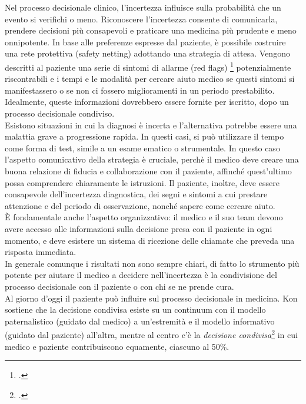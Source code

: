 Nel processo decisionale clinico, l'incertezza influisce sulla probabilità che un evento si verifichi o meno. Riconoscere l'incertezza consente di comunicarla, prendere decisioni più consapevoli e praticare una medicina più prudente e meno onnipotente.
In base alle preferenze espresse dal paziente, è possibile costruire una rete protettiva (safety netting) adottando una strategia di attesa. Vengono descritti al paziente una serie di sintomi di allarme (red flags) \footcite{womak:recenti-progressi-medicina} potenzialmente riscontrabili e i tempi e le modalità per cercare aiuto medico se questi sintomi si manifestassero o se non ci fossero miglioramenti in un periodo prestabilito. Idealmente, queste informazioni dovrebbero essere fornite per iscritto, dopo un processo decisionale condiviso.\\

Esistono situazioni in cui la diagnosi è incerta e l'alternativa potrebbe essere una malattia grave a progressione rapida. In questi casi, si può utilizzare il tempo come forma di test, simile a un esame ematico o strumentale. In questo caso l'aspetto comunicativo della strategia è cruciale, perchè il medico deve creare una buona relazione di fiducia e collaborazione con il paziente, affinché quest'ultimo possa comprendere chiaramente le istruzioni. Il paziente, inoltre, deve essere consapevole dell'incertezza diagnostica, dei segni e sintomi a cui prestare attenzione e del periodo di osservazione, nonché sapere come cercare aiuto.\\
È fondamentale anche l'aspetto organizzativo: il medico e il suo team devono avere accesso alle informazioni sulla decisione presa con il paziente in ogni momento, e deve esistere un sistema di ricezione delle chiamate che preveda una risposta immediata.\\
In generale comunque i risultati non sono sempre chiari, di fatto lo strumento più potente per aiutare il medico a decidere nell'incertezza è la condivisione del processo decisionale con il paziente o con chi se ne prende cura.\\

Al giorno d'oggi il paziente può influire sul processo decisionale in medicina. Kon sostiene che la decisione condivisa esiste su un continuum con il modello paternalistico (guidato dal medico) a un'estremità e il modello informativo (guidato dal paziente) all'altra, mentre al centro c'è la \textit{decisione condivisa}\footcite{womak:decisione-condivisa-kon} in cui medico e paziente contribuiscono equamente, ciascuno al 50\%.\\


